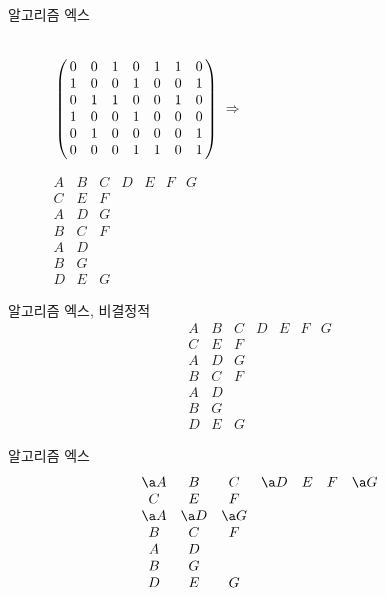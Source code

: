 \documentclass[xcolor=svgnames]{beamer}
\begin{document}
%
\begin{frame}{알고리즘 엑스}
  \begin{center}
    \Large\boldmath
    \begin{figure}[!htb]
      \hskip-17mm\begin{minipage}{.7\textwidth}
      \centering
      $\bordermatrix{
        \strut&&&&&&&\cr
        &0&0&1&0&1&1&0\cr
        &1&0&0&1&0&0&1\cr
        &0&1&1&0&0&1&0\cr
        &1&0&0&1&0&0&0\cr
        &0&1&0&0&0&0&1\cr
        &0&0&0&1&1&0&1}\ \Rightarrow$
      \end{minipage}%
      \begin{minipage}{.3\textwidth}
        \centering
        $
        \begin{array}{ccccccc}
          A & B & C & D & E & F & G\\
          C & E & F &&&&\\
          A & D & G &&&&\\
          B & C & F &&&&\\
          A & D &&&&&\\
          B & G &&&&&\\
          D & E & G &&&&
        \end{array}
        $
      \end{minipage}
    \end{figure}
  \end{center}
\end{frame}

\renewcommand\arraystretch{1.2}
%
\begin{frame}{알고리즘 엑스, 비결정적}
\Large\boldmath
  $$
  \begin{array}{ccccccc}
    A & B & C & D & E & F & G\\
    C & E & F &&&&\\
    A & D & G &&&&\\
    B & C & F &&&&\\
    A & D &&&&&\\
    B & G &&&&&\\
    D & E & G &&&&
  \end{array}
  $$
\end{frame}

%
\begin{frame}{알고리즘 엑스}
\Large\boldmath
  $$
  \begin{array}{ccccccc}
    \a A & B & C & \a D & E & F & \a G\\
    C & E & F &&&&\\
    \a A & \a D & \a G &&&&\\
    B & C & F &&&&\\
    A & D &&&&&\\
    B & G &&&&&\\
    D & E & G &&&&
  \end{array}
  $$
\end{frame}
\end{document}

